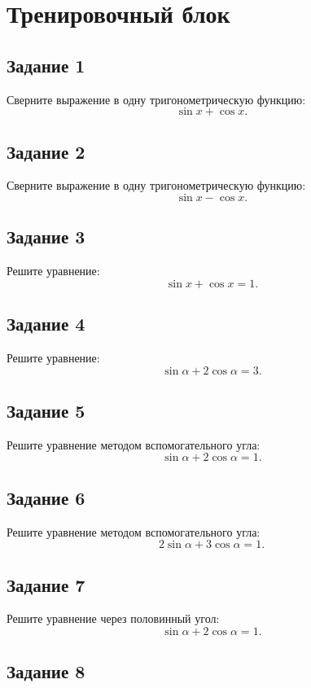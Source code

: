 \documentclass[a4paper,12pt]{article}
\begin{document}
\section*{Тренировочный блок}

\subsection*{Задание 1}

Сверните выражение в одну тригонометрическую функцию:
\[
\sin x+\cos x.
\]

\subsection*{Задание 2}

Сверните выражение в одну тригонометрическую функцию:
\[
\sin x-\cos x.
\]

\subsection*{Задание 3}

Решите уравнение:
\[
\sin x+\cos x=1.
\]

\subsection*{Задание 4}

Решите уравнение:
\[
\sin\alpha+2\cos\alpha=3.
\]

\subsection*{Задание 5}

Решите уравнение методом вспомогательного угла:
\[
\sin\alpha+2\cos\alpha=1.
\]

\subsection*{Задание 6}

Решите уравнение методом вспомогательного угла:
\[
2\sin\alpha+3\cos\alpha=1.
\]

\subsection*{Задание 7}

Решите уравнение через половинный угол:
\[
\sin\alpha+2\cos\alpha=1.
\]

\subsection*{Задание 8}
\end{document}
